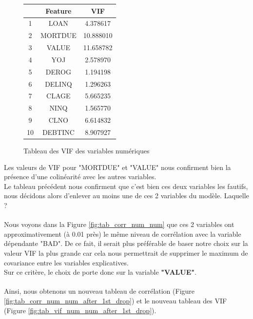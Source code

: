 \documentclass[a4paper,12pt]{report}
\begin{document}
\begin{figure}[h!]
  \begin{center}
    \begin{tabular}{||c c c||} 
     \hline
      & Feature & VIF \\ [0.5ex] 
     \hline\hline
     1 & LOAN & 4.378617 \\ 
     \hline
     2 & MORTDUE & 10.888010 \\
     \hline
     3 & VALUE & 11.658782 \\
     \hline
     4 & YOJ & 2.578970 \\
     \hline
     5 & DEROG & 1.194198 \\
     \hline
     6 & DELINQ & 1.296263 \\
     \hline
     7 & CLAGE & 5.665235 \\
     \hline
     8 & NINQ & 1.565770 \\
     \hline
     9 & CLNO & 6.614832 \\
     \hline
     10 & DEBTINC & 8.907927 \\ [1ex] 
     \hline
    \end{tabular}
  \end{center}
  \caption{Tableau des VIF des variables numériques}
  \label{fig:tab_vif_num_num}
\end{figure}

Les valeurs de VIF pour "MORTDUE" et "VALUE" nous confirment bien la présence d'une colinéarité avec les autres variables.\\
Le tableau précédent nous confirment que c'est bien ces deux variables les fautifs, nous décidons alors d'enlever au moins une de ces 2 variables
du modèle. Laquelle ?\\
\\
Nous voyons dans la Figure \ref{fig:tab_corr_num_num} que ces 2 variables ont approximativement (à 0.01 près) le même
niveau de corrélation avec la variable dépendante "BAD". De ce fait, il serait plus préférable de baser notre choix sur la valeur VIF la plus grande
car cela nous permettrait de supprimer le maximum de covariance entre les variables explicatives.\\
Sur ce critère, le choix de porte donc sur la variable \textbf{"VALUE"}.\\
\\

Ainsi, nous obtenons un nouveau tableau de corrélation (Figure \ref{fig:tab_corr_num_num_after_1st_drop}) et le nouveau
tableau des VIF (Figure \ref{fig:tab_vif_num_num_after_1st_drop}).\\
\end{document}
